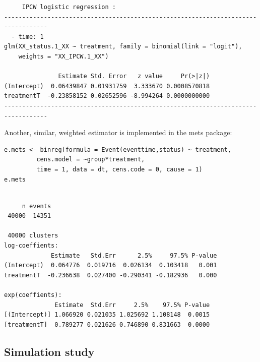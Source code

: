 \documentclass[12pt]{article}
\begin{document}
\begin{verbatim}
     IPCW logistic regression : 
----------------------------------------------------------------------------------
  - time: 1
glm(XX_status.1_XX ~ treatment, family = binomial(link = "logit"), 
    weights = "XX_IPCW.1_XX")

               Estimate Std. Error   z value     Pr(>|z|)
(Intercept)  0.06439847 0.01931759  3.333670 0.0008570818
treatmentT  -0.23858152 0.02652596 -8.994264 0.0000000000
----------------------------------------------------------------------------------
\end{verbatim}

Another, similar, weighted estimator is implemented in the mets package:
\lstset{language=r,label= ,caption= ,captionpos=b,numbers=none}
\begin{lstlisting}
e.mets <- binreg(formula = Event(eventtime,status) ~ treatment,
		 cens.model = ~group*treatment,
		 time = 1, data = dt, cens.code = 0, cause = 1)
e.mets
\end{lstlisting}

\begin{verbatim}

     n events
 40000  14351

 40000 clusters
log-coeffients:
             Estimate   Std.Err      2.5%     97.5% P-value
(Intercept)  0.064776  0.019716  0.026134  0.103418   0.001
treatmentT  -0.236638  0.027400 -0.290341 -0.182936   0.000

exp(coeffients):
              Estimate  Std.Err     2.5%    97.5% P-value
[(Intercept)] 1.066920 0.021035 1.025692 1.108148  0.0015
[treatmentT]  0.789277 0.021626 0.746890 0.831663  0.0000
\end{verbatim}


\subsection{Simulation study}
\label{sec:org18ddb1f}
\end{document}
